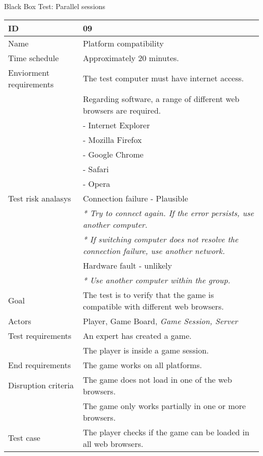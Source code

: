 {\begin{table}[H]
\caption{Black Box Test: Parallel sessions}
\label{fig:black_box_test_8}
\end{table}}


{\footnotesize
\begin{table}[H]
\begin{tabular}{| p{5cm} | p{10cm} |}\hline
	\textbf{ID}	& \textbf{09} \\ \hline
	Name		& Platform compatibility\\ \hline
	Time schedule	& Approximately 20 minutes.\\ \hline
	Enviorment requirements 
		& The test computer must have internet access. \\
		& Regarding software, a range of different web browsers are required.\\
		& - Internet Explorer\\
		& - Mozilla Firefox\\
		& - Google Chrome\\
		& - Safari\\
		& - Opera\\ \hline
	Test risk analasys
		& Connection failure - Plausible \\
		& \emph{* Try to connect again. If the error persists, use another computer.} \\
		& \emph{* If switching computer does not resolve the connection failure, use another network.}\\
		& Hardware fault - unlikely \\
		& \emph{* Use another computer within the group.} \\ \hline
	Goal	& The test is to verify that the game is compatible with different web browsers.\\ \hline
	Actors	& Player, Game Board, \emph{Game Session, Server}\\ \hline
	Test requirements
		& An expert has created a game.\\
		& The player is inside a game session.\\ \hline
	End requirements 
		& The game works on all platforms. \\ \hline
	Disruption criteria 
		& The game does not load in one of the web browsers. \\
		& The game only works partially in one or more browsers. \\ \hline
	Test case
		& The player checks if the game can be loaded in all web browsers.\\

\end{tabular}
\end{table}}
